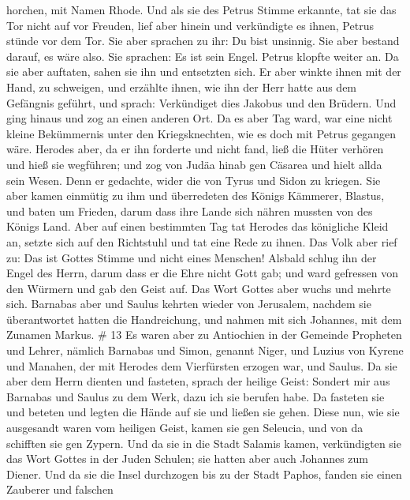 horchen, mit Namen Rhode.  Und als sie des Petrus Stimme
erkannte, tat sie das Tor nicht auf vor Freuden, lief aber hinein und
verkündigte es ihnen, Petrus stünde vor dem Tor.  Sie aber
sprachen zu ihr: Du bist unsinnig. Sie aber bestand darauf, es wäre
also. Sie sprachen: Es ist sein Engel.  Petrus klopfte
weiter an. Da sie aber auftaten, sahen sie ihn und entsetzten sich.
 Er aber winkte ihnen mit der Hand, zu schweigen, und
erzählte ihnen, wie ihn der Herr hatte aus dem Gefängnis geführt, und
sprach: Verkündiget dies Jakobus und den Brüdern. Und ging hinaus und
zog an einen anderen Ort.  Da es aber Tag ward, war eine
nicht kleine Bekümmernis unter den Kriegsknechten, wie es doch mit
Petrus gegangen wäre.  Herodes aber, da er ihn forderte und
nicht fand, ließ die Hüter verhören und hieß sie wegführen; und zog von
Judäa hinab gen Cäsarea und hielt allda sein Wesen.  Denn
er gedachte, wider die von Tyrus und Sidon zu kriegen. Sie aber kamen
einmütig zu ihm und überredeten des Königs Kämmerer, Blastus, und baten
um Frieden, darum dass ihre Lande sich nähren mussten von des Königs
Land.  Aber auf einen bestimmten Tag tat Herodes das
königliche Kleid an, setzte sich auf den Richtstuhl und tat eine Rede zu
ihnen.  Das Volk aber rief zu: Das ist Gottes Stimme und
nicht eines Menschen!  Alsbald schlug ihn der Engel des
Herrn, darum dass er die Ehre nicht Gott gab; und ward gefressen von den
Würmern und gab den Geist auf.  Das Wort Gottes aber wuchs
und mehrte sich.  Barnabas aber und Saulus kehrten wieder
von Jerusalem, nachdem sie überantwortet hatten die Handreichung, und
nahmen mit sich Johannes, mit dem Zunamen Markus. \# 13  Es
waren aber zu Antiochien in der Gemeinde Propheten und Lehrer, nämlich
Barnabas und Simon, genannt Niger, und Luzius von Kyrene und Manahen,
der mit Herodes dem Vierfürsten erzogen war, und Saulus.  Da
sie aber dem Herrn dienten und fasteten, sprach der heilige Geist:
Sondert mir aus Barnabas und Saulus zu dem Werk, dazu ich sie berufen
habe.  Da fasteten sie und beteten und legten die Hände auf
sie und ließen sie gehen.  Diese nun, wie sie ausgesandt
waren vom heiligen Geist, kamen sie gen Seleucia, und von da schifften
sie gen Zypern.  Und da sie in die Stadt Salamis kamen,
verkündigten sie das Wort Gottes in der Juden Schulen; sie hatten aber
auch Johannes zum Diener.  Und da sie die Insel durchzogen
bis zu der Stadt Paphos, fanden sie einen Zauberer und falschen
